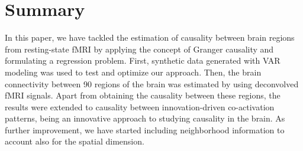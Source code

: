 \documentclass[10pt,conference,compsocconf]{IEEEtran}
\begin{document}
\section{Summary}
\label{sec:summary}
In this paper, we have tackled the estimation of causality between brain regions from resting-state fMRI by applying the concept of Granger causality and formulating a regression problem. First, synthetic data generated with VAR modeling was used to test and optimize our approach. Then, the brain connectivity between 90 regions of the brain was estimated by using deconvolved fMRI signals. Apart from obtaining the causality between these regions, the results were extended to causality between innovation-driven co-activation  patterns, being an innovative approach to studying causality in the brain. As further improvement, we have started including neighborhood information to account also for the spatial dimension.


 
\end{document}
